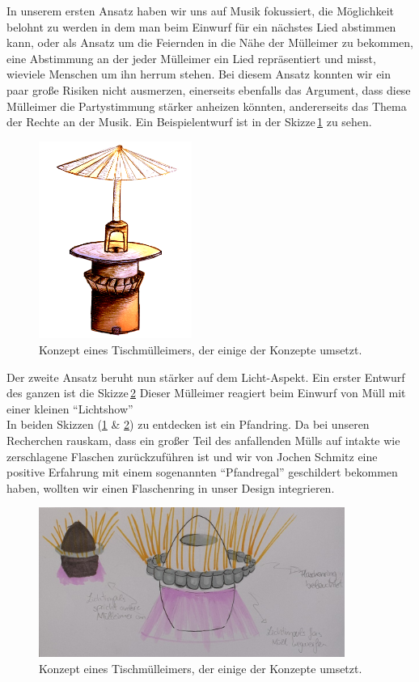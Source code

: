     In unserem ersten Ansatz haben wir uns auf Musik fokussiert, die Möglichkeit belohnt zu werden in dem man beim Einwurf für ein nächstes Lied abstimmen kann, oder als Ansatz um die Feiernden in die Nähe der Mülleimer zu bekommen, eine Abstimmung an der jeder Mülleimer ein Lied repräsentiert und misst, wieviele Menschen um ihn herrum stehen. Bei diesem Ansatz konnten wir ein paar große Risiken nicht ausmerzen, einerseits ebenfalls das Argument, dass diese Mülleimer die Partystimmung stärker anheizen könnten, andererseits das Thema der Rechte an der Musik.
    Ein Beispielentwurf ist in der Skizze\,\ref{fig:standing_desk_bin_1} zu sehen.

    \begin{figure}[H]
        \centering
        \includegraphics[width=5cm]{media/01_project/sketch_standing_table_bin.png}
        \caption{Konzept eines Tischmülleimers, der einige der Konzepte umsetzt.}
        \label{fig:standing_desk_bin_1}
    \end{figure}

    Der zweite Ansatz beruht nun stärker auf dem Licht-Aspekt.
    Ein erster Entwurf des ganzen ist die Skizze\,\ref{fig:light_bin_1}
    Dieser Mülleimer reagiert beim Einwurf von Müll mit einer kleinen \enquote{Lichtshow}\\

    In beiden Skizzen (\ref{fig:standing_desk_bin_1} \& \ref{fig:light_bin_1}) zu entdecken ist ein Pfandring. Da bei unseren Recherchen rauskam, dass ein großer Teil des anfallenden Mülls auf intakte wie zerschlagene Flaschen zurückzuführen ist und wir von Jochen Schmitz eine positive Erfahrung mit einem sogenannten \enquote{Pfandregal} geschildert bekommen haben, wollten wir einen Flaschenring in unser Design integrieren.   



    \begin{figure}[H]
        \centering
        \includegraphics[width=10cm]{media/01_project/sketch_party_bin.jpg}
        \caption{Konzept eines Tischmülleimers, der einige der Konzepte umsetzt.}
        \label{fig:light_bin_1}
    \end{figure}

